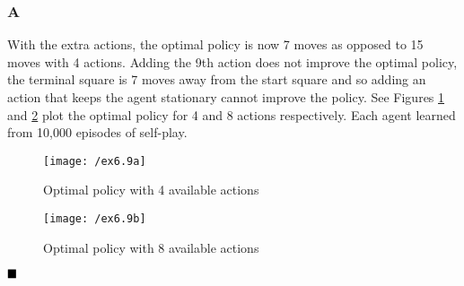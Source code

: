 \subsubsection{A}
\ProgrammingExercise
With the extra actions, the optimal policy is now 7 moves as opposed to 15 moves with 4 actions. Adding the 9th action does not improve the optimal policy, the terminal square is 7 moves away from the start square and so adding an action that keeps the agent stationary cannot improve the policy. See Figures \ref{fig:ex6.9a} and \ref{fig:ex6.9b} plot the optimal policy for 4 and 8 actions respectively. Each agent learned from 10,000 episodes of self-play.
\begin{figure}[h!]
	\centering
	\texttt{[image: /ex6.9a]}
	\caption{Optimal policy with 4 available actions}
	\label{fig:ex6.9a}
\end{figure}
\begin{figure}[h!]
	\centering
	\texttt{[image: /ex6.9b]}
	\caption{Optimal policy with 8 available actions}
	\label{fig:ex6.9b}
\end{figure}
$
\hfill \blacksquare
$